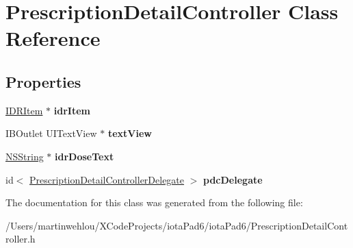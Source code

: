 \hypertarget{interface_prescription_detail_controller}{
\section{PrescriptionDetailController Class Reference}
\label{interface_prescription_detail_controller}
}
\subsection*{Properties}
\begin{DoxyCompactItemize}
\item 
\hypertarget{interface_prescription_detail_controller_ac027530e8b4b1e5e0531515d272c1a69}{
\hyperlink{interface_i_d_r_item}{IDRItem} $\ast$ {\bfseries idrItem}}
\label{interface_prescription_detail_controller_ac027530e8b4b1e5e0531515d272c1a69}

\item 
\hypertarget{interface_prescription_detail_controller_ae9cce597b9dd3587b9a6c758933b3220}{
IBOutlet UITextView $\ast$ {\bfseries textView}}
\label{interface_prescription_detail_controller_ae9cce597b9dd3587b9a6c758933b3220}

\item 
\hypertarget{interface_prescription_detail_controller_ab3138984dc407de13f67ea3123c1a097}{
\hyperlink{class_n_s_string}{NSString} $\ast$ {\bfseries idrDoseText}}
\label{interface_prescription_detail_controller_ab3138984dc407de13f67ea3123c1a097}

\item 
\hypertarget{interface_prescription_detail_controller_a0635a389df6ee3f8bcb6464620044a5b}{
id$<$ \hyperlink{protocol_prescription_detail_controller_delegate-p}{PrescriptionDetailControllerDelegate} $>$ {\bfseries pdcDelegate}}
\label{interface_prescription_detail_controller_a0635a389df6ee3f8bcb6464620044a5b}

\end{DoxyCompactItemize}


The documentation for this class was generated from the following file:\begin{DoxyCompactItemize}
\item 
/Users/martinwehlou/XCodeProjects/iotaPad6/iotaPad6/PrescriptionDetailController.h\end{DoxyCompactItemize}

